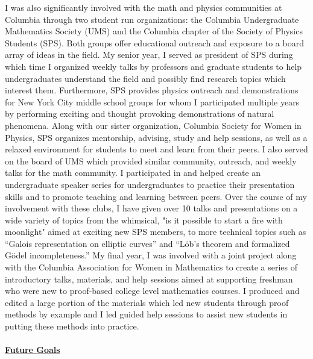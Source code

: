 \documentclass[11pt]{amsart}
\begin{document}
\par
I was also significantly involved with the math and physics communities at Columbia through two student run organizations: the Columbia Undergraduate Mathematics Society (UMS) and the Columbia chapter of the Society of Physics Students (SPS). Both groups offer educational outreach and exposure to a board array of ideas in the field. My senior year, I served as president of SPS during which time I organized weekly talks by professors and graduate students to help undergraduates understand the field and possibly find research topics which interest them. Furthermore, SPS provides physics outreach and demonstrations for New York City middle school groups for whom I participated multiple years by performing exciting and thought provoking demonstrations of natural phenomena. Along with our sister organization, Columbia Society for Women in Physics, SPS organizes mentorship, advising, study and help sessions, as well as a relaxed environment for students to meet and learn from their peers. I also served on the board of UMS which provided similar community, outreach, and weekly talks for the math community. I participated in and helped create an undergraduate speaker series for undergraduates to practice their presentation skills and to promote teaching and learning between peers. Over the course of my involvement with these clubs, I have given over 10 talks and presentations on a wide variety of topics from the whimsical, "is it possible to start a fire with moonlight" aimed at exciting new SPS members, to more technical topics such as ``Galois representation on elliptic curves'' and ``L\"{o}b's theorem and formalized G\"{o}del incompleteness.'' My final year, I was involved with a joint project along with the Columbia Association for Women in Mathematics to create a series of introductory talks, materials, and help sessions aimed at supporting freshman who were new to proof-based college level mathematics courses. I produced and edited a large portion of the materials which led new students through proof methods by example and I led guided help sessions to assist new students in putting these methods into practice.
\\
\\
\noindent
\underline{\textbf{Future Goals}}
\\
\end{document}
